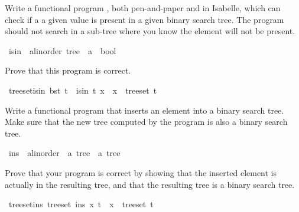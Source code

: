\begin{isabellebody}
\begin{isamarkuptext}
    Write a functional program , both pen-and-paper and in Isabelle, which can check if a
    a given value is present in a given binary search tree. The program should not search in a
    sub-tree where you know the element will not be present.%
\end{isamarkuptext}\isamarkuptrue%
\isamarkupfalse%
\ isin\ {\isacharcolon}{\kern0pt}{\isacharcolon}{\kern0pt}\ {\isachardoublequoteopen}{\isacharparenleft}{\kern0pt}{\isacharprime}{\kern0pt}a{\isacharcolon}{\kern0pt}{\isacharcolon}{\kern0pt}linorder{\isacharparenright}{\kern0pt}\ tree\ {\isasymRightarrow}\ {\isacharprime}{\kern0pt}a\ {\isasymRightarrow}\ bool{\isachardoublequoteclose}\ %
\begin{isamarkuptext}%
Prove that this program is correct.%
\end{isamarkuptext}\isamarkuptrue%
\isamarkupfalse%
\ tree{\isacharunderscore}{\kern0pt}set{\isacharunderscore}{\kern0pt}isin{\isacharcolon}{\kern0pt}\ {\isachardoublequoteopen}bst\ t\ {\isasymLongrightarrow}\ isin\ t\ x\ {\isacharequal}{\kern0pt}\ {\isacharparenleft}{\kern0pt}x\ {\isasymin}\ tree{\isacharunderscore}{\kern0pt}set\ t{\isacharparenright}{\kern0pt}{\isachardoublequoteclose}%
\isadelimproof
%
\endisadelimproof
%
\isatagproof
%
\endisatagproof
{\isafoldproof}%
%
\isadelimproof
%
\endisadelimproof
%
\begin{isamarkuptext}%
%
\end{isamarkuptext}\isamarkuptrue%
%
\begin{isamarkuptext}%
Write a functional program that inserts an element into a binary search tree. Make sure that
      the new tree computed by the program is also a binary search tree.%
\end{isamarkuptext}\isamarkuptrue%
\isamarkupfalse%
\ ins\ {\isacharcolon}{\kern0pt}{\isacharcolon}{\kern0pt}\ {\isachardoublequoteopen}{\isacharprime}{\kern0pt}a{\isacharcolon}{\kern0pt}{\isacharcolon}{\kern0pt}linorder\ {\isasymRightarrow}\ {\isacharprime}{\kern0pt}a\ tree\ {\isasymRightarrow}\ {\isacharprime}{\kern0pt}a\ tree{\isachardoublequoteclose}\ %
\begin{isamarkuptext}%
Prove that your program is correct by showing that the inserted element is actually in the 
      resulting tree, and that the resulting tree is a binary search tree.%
\end{isamarkuptext}\isamarkuptrue%
\isamarkupfalse%
\ tree{\isacharunderscore}{\kern0pt}set{\isacharunderscore}{\kern0pt}ins{\isacharcolon}{\kern0pt}\ {\isachardoublequoteopen}tree{\isacharunderscore}{\kern0pt}set\ {\isacharparenleft}{\kern0pt}ins\ x\ t{\isacharparenright}{\kern0pt}\ {\isacharequal}{\kern0pt}\ {\isacharbraceleft}{\kern0pt}x{\isacharbraceright}{\kern0pt}\ {\isasymunion}\ tree{\isacharunderscore}{\kern0pt}set\ t{\isachardoublequoteclose}%

\end{isabellebody}
